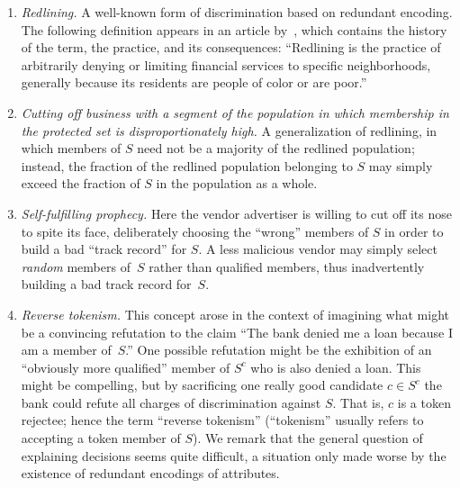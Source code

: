\documentclass[letterpaper,11pt]{article}
\theoremstyle{definition}
\newcommand{\Sfp}{Self-fulfilling prophecy}
\newcommand{\vendor}{vendor}
\newcommand{\Scomp}{S^c}
\begin{document}
\begin{enumerate}
\item
{\em Redlining.}
A well-known form of discrimination based on redundant encoding.
The following definition appears in an article by~\cite{Hunt05}, which
contains the history of the term, the practice, and its consequences:
``Redlining is the practice of arbitrarily denying or limiting financial
services to specific neighborhoods, generally because its residents are people
of color or are poor.''
\item
{\em Cutting off business with a segment of the population in which
membership in the protected set is disproportionately high.}
A generalization of redlining, in which
members of $S$ need not be a majority of the redlined population;
instead, the fraction of the redlined population belonging to $S$ may
simply exceed the fraction of $S$ in the population as a whole.
\item
{\em \Sfp .}
Here the \vendor {}
advertiser is willing to cut off its nose to spite its face,
deliberately choosing the ``wrong'' members of $S$
in order to build a bad ``track record'' for $S$. A less malicious \vendor{}
may simply select \emph{random} members of~$S$ rather than qualified members,
thus inadvertently building a bad track record for~$S.$
\item
{\em Reverse tokenism.}
This concept arose in the context of imagining what might be a convincing
refutation to the claim ``The bank denied me a loan because I am a member
of~$S$.''  One possible refutation might be the exhibition of an ``obviously
more qualified'' member of $\Scomp$ who is also denied a loan.
This might be compelling, but by sacrificing one really good candidate
$c \in \Scomp$ the bank could refute all charges of discrimination
against $S$.  That is, $c$ is a token rejectee; hence the term
``reverse tokenism''  (``tokenism'' usually refers to accepting a token
member of $S$).
We remark that the general question of explaining decisions seems
quite difficult, a situation only made worse by the existence
of redundant encodings of attributes.
\end{enumerate}
\end{document}
